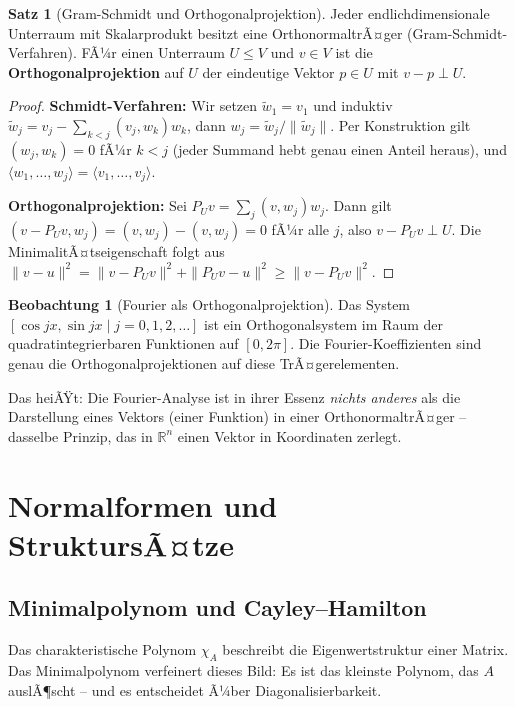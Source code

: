 ﻿\documentclass[a4paper,12pt]{report}
\theoremstyle{definition}
\newtheorem{satz}{Satz}
\newtheorem{beobachtung}{Beobachtung}
\begin{document}
\begin{satz}[Gram-Schmidt und Orthogonalprojektion]
    Jeder endlichdimensionale Unterraum mit Skalarprodukt besitzt eine
    OrthonormaltrÃ¤ger (Gram-Schmidt-Verfahren). FÃ¼r einen Unterraum $U \le V$
    und $v \in V$ ist die \textbf{Orthogonalprojektion} auf $U$ der eindeutige
    Vektor $p \in U$ mit $v - p \perp U$.
\end{satz}
\begin{proof}
    \textbf{Schmidt-Verfahren:} Wir setzen $\tilde{w}_1 = v_1$ und induktiv
    $\tilde{w}_j = v_j - \sum_{k<j} (v_j, w_k) w_k$, dann $w_j = \tilde{w}_j / \|\tilde{w}_j\|$.
    Per Konstruktion gilt $(w_j, w_k) = 0$ fÃ¼r $k < j$ (jeder Summand hebt genau
    einen Anteil heraus), und $\langle w_1, \ldots, w_j \rangle = \langle v_1, \ldots, v_j \rangle$.

    \textbf{Orthogonalprojektion:} Sei $P_U v = \sum_j (v, w_j) w_j$.
    Dann gilt $(v - P_U v, w_j) = (v, w_j) - (v, w_j) = 0$ fÃ¼r alle $j$,
    also $v - P_U v \perp U$. Die MinimalitÃ¤tseigenschaft folgt aus
    $\|v - u\|^2 = \|v - P_U v\|^2 + \|P_U v - u\|^2 \geq \|v - P_U v\|^2$.
\end{proof}


\begin{beobachtung}[Fourier als Orthogonalprojektion]
    Das System $[\cos jx, \sin jx \mid j = 0, 1, 2, \dots]$ ist ein
    Orthogonalsystem im Raum der quadratintegrierbaren Funktionen auf
    $[0, 2\pi]$. Die Fourier-Koeffizienten sind genau die
    Orthogonalprojektionen auf diese TrÃ¤gerelementen.

    Das heiÃŸt: Die Fourier-Analyse ist in ihrer Essenz \emph{nichts anderes}
    als die Darstellung eines Vektors (einer Funktion) in einer
    OrthonormaltrÃ¤ger -- dasselbe Prinzip, das in $\mathbb{R}^n$ einen
    Vektor in Koordinaten zerlegt.
\end{beobachtung}

\chapter{Normalformen und StruktursÃ¤tze}

\section{Minimalpolynom und Cayley--Hamilton}

Das charakteristische Polynom $\chi_A$ beschreibt die Eigenwertstruktur
einer Matrix. Das Minimalpolynom verfeinert dieses Bild: Es ist das
kleinste Polynom, das $A$ auslÃ¶scht -- und es entscheidet Ã¼ber
Diagonalisierbarkeit.
\end{document}
